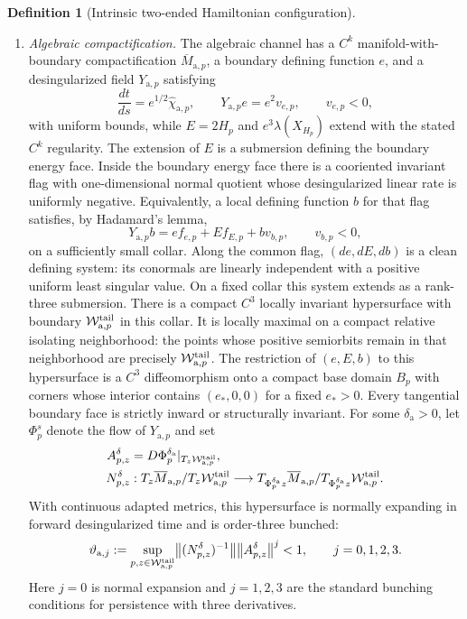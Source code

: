 \documentclass[11pt]{amsart}
\numberwithin{equation}{section}
\theoremstyle{definition}
\newtheorem{definition}[theorem]{Definition}
\theoremstyle{remark}
\begin{document}
\begin{definition}[Intrinsic two-ended Hamiltonian configuration]
\begin{enumerate}
\item \emph{Algebraic compactification.}
The algebraic channel has a $C^k$ manifold-with-boundary compactification
$\overline M_{\mathrm a,p}$,
a boundary defining function $e$, and a desingularized field
$Y_{\mathrm a,p}$ satisfying
\begin{equation}\label{eq:intrinsic-algebraic-data}
 \frac{dt}{ds}=e^{1/2}\widehat\chi_{\mathrm a,p},\qquad
 Y_{\mathrm a,p}e=e^2v_{e,p},\qquad v_{e,p}<0,
\end{equation}
with uniform bounds, while $E=2H_p$ and
$e^3\lambda(X_{H_p})$ extend with the stated $C^k$ regularity.  The
extension of $E$ is a submersion defining the boundary energy face.
Inside the boundary energy face there is a cooriented invariant flag with
one-dimensional normal quotient whose desingularized linear rate is
uniformly negative.  Equivalently, a local defining function $b$ for that
flag satisfies, by Hadamard's lemma,
\[
 Y_{\mathrm a,p}b=e f_{e,p}+E f_{E,p}+b v_{b,p},
 \qquad v_{b,p}<0,
\]
on a sufficiently small collar.
Along the common flag, $(de,dE,db)$ is a clean defining system: its
conormals are linearly independent with a positive uniform least singular
value.  On a fixed collar this system extends as a rank-three submersion.
There is a compact $C^3$ locally invariant hypersurface with boundary
$\mathcal W^{\rm tail}_{\mathrm a,p}$ in this collar.  It is locally
maximal on a compact relative isolating neighborhood: the points whose
positive semiorbits remain in that neighborhood are precisely
$\mathcal W^{\rm tail}_{\mathrm a,p}$.  The restriction of $(e,E,b)$ to
this hypersurface is a $C^3$ diffeomorphism onto a compact base domain
$B_p$ with corners whose interior contains $(e_*,0,0)$ for a fixed
$e_*>0$.  Every tangential boundary face is strictly inward or
structurally invariant.  For some $\delta_{\mathrm a}>0$, let
 $\Phi_p^s$ denote the flow of $Y_{\mathrm a,p}$ and set
\begin{align*}
 A^{\delta}_{p,z}
 &=D\Phi_p^{\delta_{\mathrm a}}|_{T_z\mathcal W^{\rm tail}_{\mathrm a,p}},\\
 N^{\delta}_{p,z}
 &:T_z\overline M_{\mathrm a,p}/T_z\mathcal W^{\rm tail}_{\mathrm a,p}
   \longrightarrow
   T_{\Phi_p^{\delta_{\mathrm a}}z}\overline M_{\mathrm a,p}/
   T_{\Phi_p^{\delta_{\mathrm a}}z}\mathcal W^{\rm tail}_{\mathrm a,p}.
\end{align*}
With continuous adapted metrics, this hypersurface is normally expanding
in forward desingularized time and is order-three bunched:
\begin{equation}\label{eq:intrinsic-algebraic-normal-bunching}
 \vartheta_{\mathrm a,j}:=
 \sup_{p,z\in\mathcal W^{\rm tail}_{\mathrm a,p}}
 \bigl\|(N^\delta_{p,z})^{-1}\bigr\|
 \bigl\|A^\delta_{p,z}\bigr\|^j<1,
 \qquad j=0,1,2,3.
\end{equation}
Here $j=0$ is normal expansion and $j=1,2,3$ are the standard bunching
conditions for persistence with three derivatives.


\end{enumerate}
\end{definition}
\end{document}
